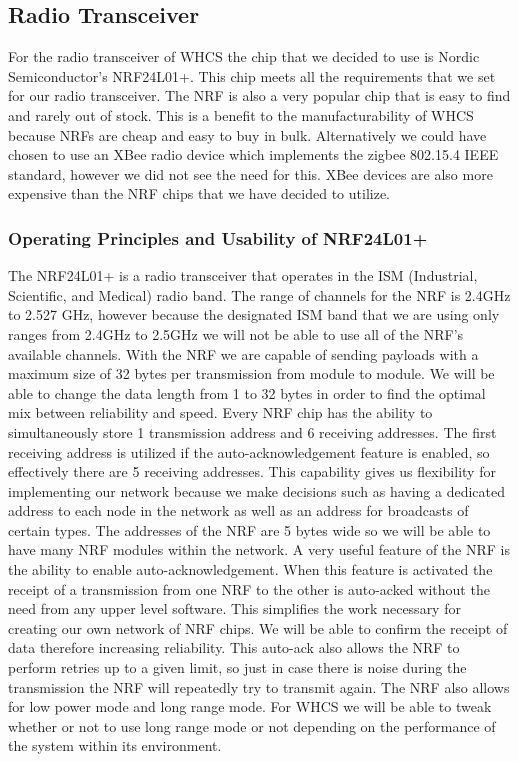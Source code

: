 \subsection{Radio Transceiver}
For the radio transceiver of WHCS the chip that we decided to use is Nordic
Semiconductor{}'s NRF24L01+. This chip meets all the requirements that we set
for our radio transceiver. The NRF is also a very popular chip that is easy to
find and rarely out of stock. This is a benefit to the manufacturability of
WHCS because NRFs are cheap and easy to buy in bulk. Alternatively we could
have chosen to use an XBee radio device which implements the zigbee 802.15.4
IEEE standard, however we did not see the need for this. XBee devices are also
more expensive than the NRF chips that we have decided to utilize.

\subsubsection{Operating Principles and Usability of NRF24L01+}
The NRF24L01+ is a radio transceiver that operates in the ISM (Industrial,
Scientific, and Medical) radio band. The range of channels for the NRF is
2.4GHz to 2.527 GHz, however because the designated ISM band that we are using
only ranges from 2.4GHz to 2.5GHz we will not be able to use all of the NRF{}'s
available channels. With the NRF we are capable of sending payloads with a
maximum size of 32 bytes per transmission from module to module. We will be
able to change the data length from 1 to 32 bytes in order to find the optimal
mix between reliability and speed. Every NRF chip has the ability to
simultaneously store 1 transmission address and 6 receiving addresses. The
first receiving address is utilized if the auto{}-acknowledgement feature is
enabled, so effectively there are 5 receiving addresses.  This capability gives
us flexibility for implementing our network because we make decisions such as
having a dedicated address to each node in the network as well as an address
for broadcasts of certain types. The addresses of the NRF are 5 bytes wide so
we will be able to have many NRF modules within the network. A very useful
feature of the NRF is the ability to enable auto{}-acknowledgement. When this
feature is activated the receipt of a transmission from one NRF to the other is
auto{}-acked without the need from any upper level software. This simplifies
the work necessary for creating our own network of NRF chips. We will be able
to confirm the receipt of data therefore increasing reliability.  This
auto{}-ack also allows the NRF to perform retries up to a given limit, so just
in case there is noise during the transmission the NRF will repeatedly try to
transmit again. The NRF also allows for low power mode and long range mode.
For WHCS we will be able to tweak whether or not to use long range mode or not
depending on the performance of the system within its environment.

